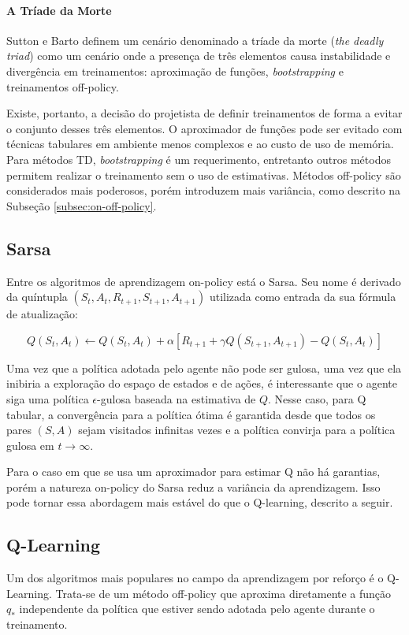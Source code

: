 \paragraph{A Tríade da Morte} Sutton e Barto definem um cenário denominado a tríade da morte (\textit{the deadly triad}) como um cenário onde a presença de três elementos causa instabilidade e divergência em treinamentos: aproximação de funções, \textit{bootstrapping} e treinamentos off-policy. \cite{sutton2018reinforcement}
\par Existe, portanto, a decisão do projetista de definir treinamentos de forma a evitar o conjunto desses três elementos. O aproximador de funções pode ser evitado com técnicas tabulares em ambiente menos complexos e ao custo de uso de memória. Para métodos TD, \textit{bootstrapping} é um requerimento, entretanto outros métodos permitem realizar o treinamento sem o uso de estimativas. Métodos off-policy são considerados mais poderosos, porém introduzem mais variância, como descrito na Subseção \ref{subsec:on-off-policy}.

\subsection{Sarsa}
\label{subsec:sarsa-theory}
Entre os algoritmos de aprendizagem on-policy está o Sarsa. Seu nome é derivado da quíntupla $(S_t, A_t, R_{t+1}, S_{t+1}, A_{t+1})$ utilizada como entrada da sua fórmula de atualização:

\begin{equation}
	Q(S_t, A_t) \leftarrow Q(S_t, A_t) + \alpha[R_{t+1} + \gamma Q(S_{t+1}, A_{t+1}) - Q(S_t, A_t)]
\end{equation}

Uma vez que a política adotada pelo agente não pode ser gulosa, uma vez que ela inibiria a exploração do espaço de estados e de ações, é interessante que o agente siga uma política $\epsilon$-gulosa baseada na estimativa de $Q$. Nesse caso, para Q tabular, a convergência para a política ótima é garantida desde que todos os pares $(S, A)$ sejam visitados infinitas vezes e a política convirja para a política gulosa em $t \to \infty$.

Para o caso em que se usa um aproximador para estimar Q não há garantias, porém a natureza on-policy do Sarsa reduz a variância da aprendizagem. Isso pode tornar essa abordagem mais estável do que o Q-learning, descrito a seguir.

\subsection{Q-Learning}
\label{subsec:q-theory}
Um dos algoritmos mais populares no campo da aprendizagem por reforço é o Q-Learning. Trata-se de um método off-policy que aproxima diretamente a função $q_*$ independente da política que estiver sendo adotada pelo agente durante o treinamento.

